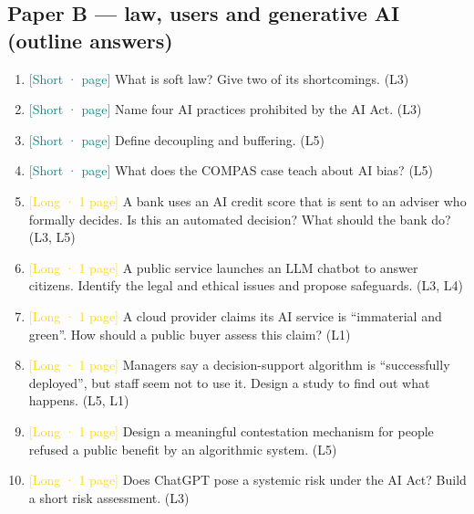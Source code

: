 \documentclass[11pt,a4paper]{article}
\begin{document}
\subsection{Paper B — law, users and generative AI (outline answers)}\begin{enumerate}[label=\textbf{Q\arabic*.},leftmargin=2.4em]
\item \textcolor{teal}{[Short · \textonequarter{} page]} What is soft law? Give two of its shortcomings. {\small\color{gray}(L3)}
\item \textcolor{teal}{[Short · \textonequarter{} page]} Name four AI practices prohibited by the AI Act. {\small\color{gray}(L3)}
\item \textcolor{teal}{[Short · \textonequarter{} page]} Define decoupling and buffering. {\small\color{gray}(L5)}
\item \textcolor{teal}{[Short · \textonequarter{} page]} What does the COMPAS case teach about AI bias? {\small\color{gray}(L5)}
\item \textcolor{gold}{[Long · 1 page]} A bank uses an AI credit score that is sent to an adviser who formally decides. Is this an automated decision? What should the bank do? {\small\color{gray}(L3, L5)}
\item \textcolor{gold}{[Long · 1 page]} A public service launches an LLM chatbot to answer citizens. Identify the legal and ethical issues and propose safeguards. {\small\color{gray}(L3, L4)}
\item \textcolor{gold}{[Long · 1 page]} A cloud provider claims its AI service is “immaterial and green”. How should a public buyer assess this claim? {\small\color{gray}(L1)}
\item \textcolor{gold}{[Long · 1 page]} Managers say a decision-support algorithm is “successfully deployed”, but staff seem not to use it. Design a study to find out what happens. {\small\color{gray}(L5, L1)}
\item \textcolor{gold}{[Long · 1 page]} Design a meaningful contestation mechanism for people refused a public benefit by an algorithmic system. {\small\color{gray}(L5)}
\item \textcolor{gold}{[Long · 1 page]} Does ChatGPT pose a systemic risk under the AI Act? Build a short risk assessment. {\small\color{gray}(L3)}
\end{enumerate}
\end{document}
